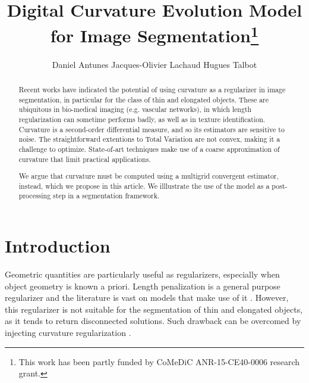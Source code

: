 \documentclass[runningheads]{llncs}
\begin{document}
%
\title{Digital Curvature Evolution Model for Image Segmentation\thanks{This  work has  been  partly  funded by CoMeDiC ANR-15-CE40-0006 research grant.}}

\author{Daniel Antunes
Jacques-Olivier Lachaud
Hugues Talbot}
%
%
%
\maketitle              %
%
\begin{abstract}
  Recent works have indicated the potential of using curvature as a
  regularizer in image segmentation, in particular for the class of
  thin and elongated objects. These are ubiquitous in bio-medical
  imaging (e.g. vascular networks), in which length regularization can
  sometime performs badly, as well as in texture
  identification. Curvature is a second-order differential measure,
  and so its estimators are sensitive to noise. The straightforward
  extentions to Total Variation are not convex, making it a challenge
  to optimize.  State-of-art techniques make use of a coarse
  approximation of curvature that limit practical applications.

  We argue that curvature must be computed
  using a multigrid convergent estimator, instead, which we propose
  in this article. We illlustrate the use of the model as a post-processing step in a
  segmentation framework.
 
\end{abstract}
%
%
%
\setcounter{footnote}{0}
\section{Introduction}

Geometric quantities are particularly useful as regularizers, especially when object geometry is known a priori. Length penalization is a general purpose regularizer and the literature is vast on models that make use of it \cite{casseles97,appleton05}. However, this regularizer is not suitable for the segmentation of thin and elongated objects, as it tends to return disconnected solutions. Such drawback can be overcomed by injecting curvature regularization \cite{zehiry10}.
				
\end{document}
